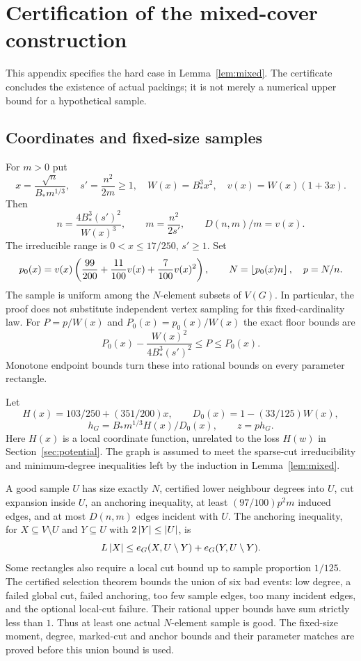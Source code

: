 \section{Certification of the mixed-cover construction}\label{app:cover}
This appendix specifies the hard case in Lemma~\ref{lem:mixed}. The
certificate concludes the existence of actual packings; it is not merely
a numerical upper bound for a hypothetical sample.

\subsection{Coordinates and fixed-size samples}
For $m>0$ put
\[
 x=\frac{\sqrt n}{B_*m^{1/3}},\quad s'=\frac{n^2}{2m}\ge1,\quad
 W(x)=B_*^3x^2,\quad v(x)=W(x)(1+3x).
\]
Then
\begin{equation}\label{eq:cover-coordinates}
 n=\frac{4B_*^3(s')^2}{W(x)^3},\qquad
 m=\frac{n^2}{2s'},\qquad D(n,m)/m=v(x).
\end{equation}
The irreducible range is $0<x\le17/250$, $s'\ge1$.
Set
\[
 p_0(x)=v(x)\left(\frac{99}{200}+\frac{11}{100}v(x)
                                      +\frac7{100}v(x)^2\right),\qquad
 N=\left\lfloor p_0(x)n\right\rfloor,\quad p=N/n.
\]
The sample is uniform among the $N$-element subsets of $V(G)$.
In particular, the proof does not substitute independent vertex sampling
for this fixed-cardinality law. For $P=p/W(x)$ and
$P_0(x)=p_0(x)/W(x)$ the exact floor bounds are
\[
 P_0(x)-\frac{W(x)^2}{4B_*^3(s')^2}\le P\le P_0(x).
\]
Monotone endpoint bounds turn these into rational bounds on every parameter
rectangle.

Let
\[
 H(x)=103/250+(351/200)x,\qquad D_0(x)=1-(33/125)W(x),
 \]\[
 h_G=B_*m^{1/3}H(x)/D_0(x),\qquad z=ph_G.
\]
Here $H(x)$ is a local coordinate function, unrelated to the loss $H(w)$
in Section~\ref{sec:potential}. The graph is assumed to meet the sparse-cut
irreducibility and minimum-degree inequalities left by the induction in
Lemma~\ref{lem:mixed}.

A good sample $U$ has size exactly $N$, certified lower neighbour degrees
into $U$, cut expansion inside $U$, an anchoring inequality, at least
$(97/100)p^2m$ induced edges, and at most $D(n,m)$ edges incident with $U$.
The anchoring inequality, for $X\subseteq V\setminus U$ and
$Y\subseteq U$ with $2\left|Y\right|\le\left|U\right|$, is
\[
 L\left|X\right|\le e_G(X,U\setminus Y)+e_G(Y,U\setminus Y).
\]
Some rectangles also require a local cut bound up to sample proportion
$1/125$. The certified selection theorem bounds the union of six bad events:
low degree, a failed global cut, failed anchoring, too few sample edges,
too many incident edges, and the optional local-cut failure. Their rational
upper bounds have sum strictly less than $1$. Thus at least one actual
$N$-element sample is good. The fixed-size moment, degree, marked-cut and
anchor bounds and their parameter matches are proved before this union
bound is used.

